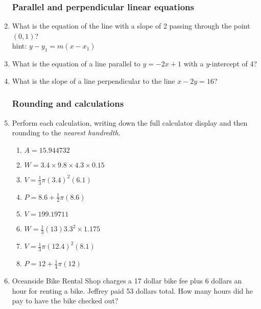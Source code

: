 \documentclass[12pt, twoside]{article}
\begin{document}
\begin{enumerate}
\newpage
\subsubsection*{Parallel and perpendicular linear equations}

  \item What is the equation of the line with a slope of 2 passing through the point $(0,1)$? \\
  hint: $y-y_1=m(x-x_1)$ \vspace{1.5cm}
  \item What is the equation of a line parallel to $y=-2x+1$ with a $y$-intercept of 4? \vspace{1.5cm}
  \item What is the slope of a line perpendicular to the line $x-2y=16$? \vspace{3cm}

\subsubsection*{Rounding and calculations}
  \item Perform each calculation, writing down the full calculator display and then rounding to the \emph{nearest hundredth}.
    \begin{multicols}{2}
    \begin{enumerate}[itemsep=2cm]
      \item $A=15.944732$
      \item $W=3.4 \times 9.8 \times 4.3 \times 0.15$
            
      \item $V=\frac{1}{3} \pi (3.4)^2(6.1)$
      \item $P=8.6 + \frac{1}{2} \pi (8.6)$  
      \item $V=199.19711$
      \item $W=\frac{1}{3} (13)  3.3^2 \times 1.175$
      \item $V=\frac{1}{3} \pi (12.4)^2(8.1)$
      \item $P=12 + \frac{1}{4} \pi (12)$ 
    \end{enumerate}
    \end{multicols}\vspace{2cm}
  
     
  
  \newpage
    \item Oceanside Bike Rental Shop charges a 17 dollar bike fee plus 6 dollars an hour for renting a bike. Jeffrey paid 53 dollars total. How many hours did he pay to have the bike checked out? \vspace{6cm}
  

\end{enumerate}
\end{document}
